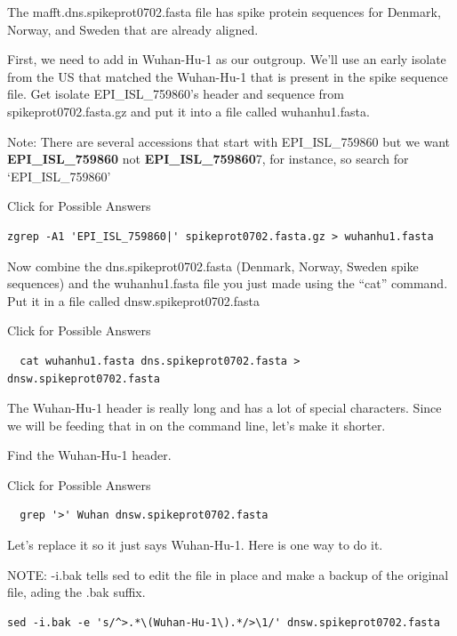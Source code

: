 \documentclass[
]{book}
\begin{document}
The mafft.dns.spikeprot0702.fasta file has spike protein sequences for Denmark, Norway, and Sweden that are already aligned.

First, we need to add in Wuhan-Hu-1 as our outgroup. We'll use an early isolate from the US that matched the Wuhan-Hu-1 that is present in the spike sequence file. Get isolate EPI\_ISL\_759860's header and sequence from spikeprot0702.fasta.gz and put it into a file called wuhanhu1.fasta.

Note: There are several accessions that start with EPI\_ISL\_759860 but we want \textbf{EPI\_ISL\_759860} not \textbf{EPI\_ISL\_759860}7, for instance, so search for `EPI\_ISL\_759860\textbar{}'

Click for Possible Answers

\begin{verbatim}
zgrep -A1 'EPI_ISL_759860|' spikeprot0702.fasta.gz > wuhanhu1.fasta
\end{verbatim}

\hfill\break

Now combine the dns.spikeprot0702.fasta (Denmark, Norway, Sweden spike sequences) and the wuhanhu1.fasta file you just made using the ``cat'' command. Put it in a file called dnsw.spikeprot0702.fasta

Click for Possible Answers

\begin{verbatim}
  cat wuhanhu1.fasta dns.spikeprot0702.fasta > dnsw.spikeprot0702.fasta
\end{verbatim}

\hfill\break

The Wuhan-Hu-1 header is really long and has a lot of special characters. Since we will be feeding that in on the command line, let's make it shorter.

Find the Wuhan-Hu-1 header.

Click for Possible Answers

\begin{verbatim}
  grep '>' Wuhan dnsw.spikeprot0702.fasta
\end{verbatim}

\hfill\break

Let's replace it so it just says Wuhan-Hu-1. Here is one way to do it.

NOTE: -i.bak tells sed to edit the file in place and make a backup of the original file, ading the .bak suffix.

\begin{verbatim}
sed -i.bak -e 's/^>.*\(Wuhan-Hu-1\).*/>\1/' dnsw.spikeprot0702.fasta
\end{verbatim}
\end{document}
